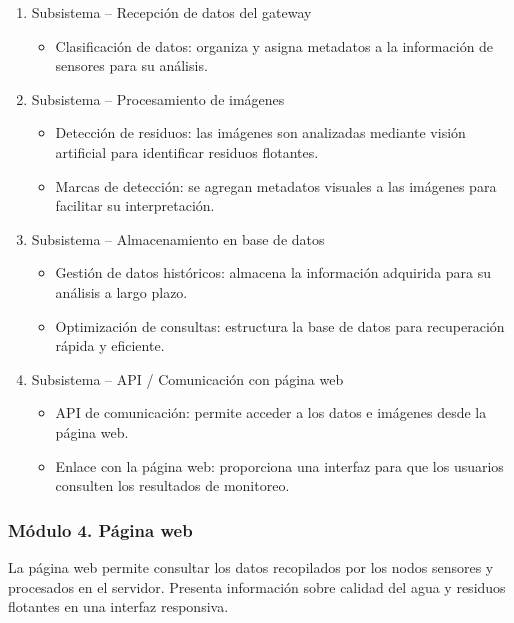 \begin{enumerate}
    \item Subsistema – Recepción de datos del gateway
    \begin{itemize}
        \item Clasificación de datos: organiza y asigna metadatos a la información de sensores para su análisis.
    \end{itemize}

    \item Subsistema – Procesamiento de imágenes
    \begin{itemize}
        \item Detección de residuos: las imágenes son analizadas mediante visión artificial para identificar residuos flotantes.
        \item Marcas de detección: se agregan metadatos visuales a las imágenes para facilitar su interpretación.
    \end{itemize}

    \item Subsistema – Almacenamiento en base de datos
    \begin{itemize}
        \item Gestión de datos históricos: almacena la información adquirida para su análisis a largo plazo.
        \item Optimización de consultas: estructura la base de datos para recuperación rápida y eficiente.
    \end{itemize}

    \item Subsistema – API / Comunicación con página web
    \begin{itemize}
        \item API de comunicación: permite acceder a los datos e imágenes desde la página web.
        \item Enlace con la página web: proporciona una interfaz para que los usuarios consulten los resultados de monitoreo.
    \end{itemize}
\end{enumerate}

\subsubsection*{Módulo 4. Página web}

La página web permite consultar los datos recopilados por los nodos sensores y procesados en el servidor. Presenta información sobre calidad del agua y residuos flotantes en una interfaz responsiva.

